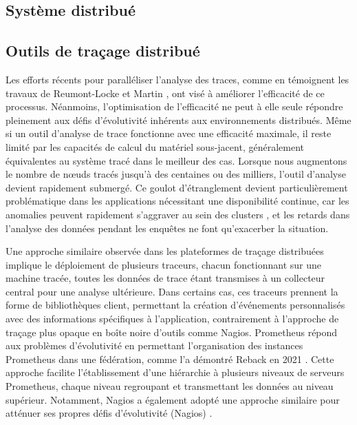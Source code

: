 \subsection{Système distribué}

\subsection{Outils de traçage distribué}

Les efforts récents pour paralléliser l'analyse des traces, comme en témoignent les travaux de Reumont-Locke \cite{reumont2015methodes} et Martin \cite{Martin2018}, ont visé à améliorer l'efficacité de ce processus. Néanmoins, l'optimisation de l'efficacité ne peut à elle seule répondre pleinement aux défis d'évolutivité inhérents aux environnements distribués. Même si un outil d'analyse de trace fonctionne avec une efficacité maximale, il reste limité par les capacités de calcul du matériel sous-jacent, généralement équivalentes au système tracé dans le meilleur des cas. Lorsque nous augmentons le nombre de nœuds tracés jusqu'à des centaines ou des milliers, l'outil d'analyse devient rapidement submergé. Ce goulot d'étranglement devient particulièrement problématique dans les applications nécessitant une disponibilité continue, car les anomalies peuvent rapidement s'aggraver au sein des clusters \cite{matloff2011programming}, et les retards dans l'analyse des données pendant les enquêtes ne font qu'exacerber la situation.

Une approche similaire observée dans les plateformes de traçage distribuées implique le déploiement de plusieurs traceurs, chacun fonctionnant sur une machine tracée, toutes les données de trace étant transmises à un collecteur central pour une analyse ultérieure. Dans certains cas, ces traceurs prennent la forme de bibliothèques client, permettant la création d'événements personnalisés avec des informations spécifiques à l'application, contrairement à l'approche de traçage plus opaque en boîte noire d'outils comme Nagios. Prometheus répond aux problèmes d'évolutivité en permettant l'organisation des instances Prometheus dans une fédération, comme l'a démontré Reback en 2021 \cite{Logz.io_prometheus_2023}. Cette approche facilite l'établissement d'une hiérarchie à plusieurs niveaux de serveurs Prometheus, chaque niveau regroupant et transmettant les données au niveau supérieur. Notamment, Nagios a également adopté une approche similaire pour atténuer ses propres défis d'évolutivité (Nagios) \cite{Nagios2019}.

